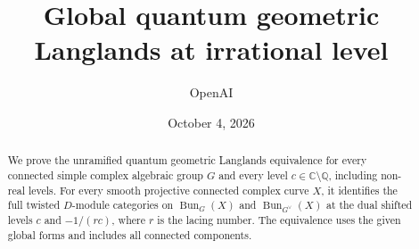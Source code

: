 \documentclass[11pt]{article}
\title{Global quantum geometric Langlands at irrational level}
\author{OpenAI}
\date{October 4, 2026}
\begin{document}
\maketitle
\begin{abstract}
We prove the unramified quantum geometric Langlands equivalence for every
connected simple complex algebraic group $G$ and every level
$c\in\mathbb C\setminus\mathbb Q$, including non-real levels. For every smooth
projective connected complex curve $X$, it identifies the full twisted
$D$-module categories on $\operatorname{Bun}_G(X)$ and
$\operatorname{Bun}_{G^\vee}(X)$ at the dual shifted levels $c$ and
$-1/(rc)$, where $r$ is the lacing number. The equivalence uses the given
global forms and includes all connected components.
\end{abstract}
\tableofcontents














\end{document}
